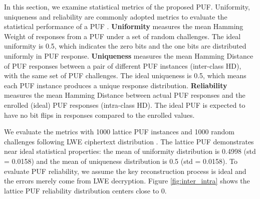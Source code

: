 

In this section, we examine statistical metrics of the proposed PUF. Uniformity, uniqueness and reliability are commonly adopted metrics to evaluate the statistical performance of a PUF \cite{maiti2013systematic}. \textbf{Uniformity} measures the mean Hamming Weight of responses from a PUF under a set of random challenges. The ideal uniformity is 0.5, which indicates the zero bits and the one bits are distributed uniformly in PUF response. \textbf{Uniqueness} measures the mean Hamming Distance of PUF responses between a pair of different PUF instances (inter-class HD), with the same set of PUF challenges. The ideal uniqueness is 0.5, which means each PUF instance produces a unique response distribution. \textbf{Reliability} measures the mean Hamming Distance between actual PUF responses and the enrolled (ideal) PUF responses (intra-class HD). The ideal PUF is expected to have no bit flips in responses compared to the enrolled values.

We evaluate the metrics with 1000 lattice PUF instances and 1000 random challenges following LWE ciphertext distribution \cite{maiti2013systematic}. The lattice PUF demonstrates near ideal statistical properties: the mean of uniformity distribution is 0.4998 (std = 0.0158) and the mean of uniqueness distribution is 0.5 (std = 0.0158). To evaluate PUF reliability, we assume the key reconstruction process is ideal and the errors merely come from LWE decryption. Figure \ref{fig:inter_intra} shows the lattice PUF reliability distribution centers close to 0. 




